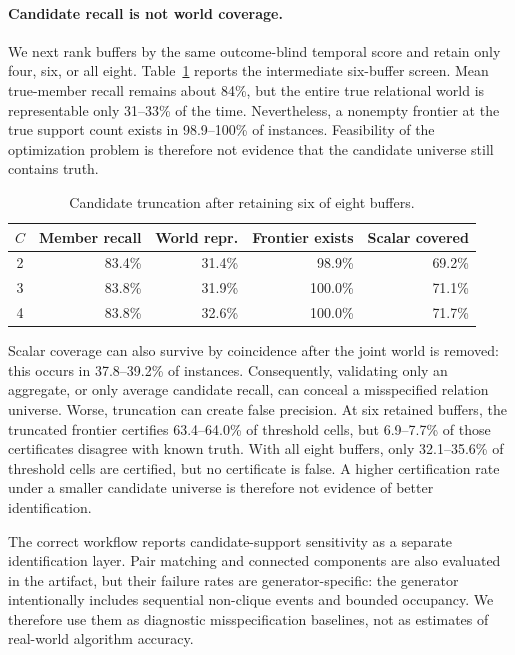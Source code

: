\paragraph{Candidate recall is not world coverage.}
We next rank buffers by the same outcome-blind temporal score and retain only
four, six, or all eight. Table~\ref{tab:truncation} reports the intermediate
six-buffer screen. Mean true-member recall remains about 84\%, but the entire
true relational world is representable only 31--33\% of the time. Nevertheless,
a nonempty frontier at the true support count exists in 98.9--100\% of
instances. Feasibility of the optimization problem is therefore not evidence
that the candidate universe still contains truth.

\begin{table}[t]
\caption{Candidate truncation after retaining six of eight buffers.}
\label{tab:truncation}
\small
\centering
\begin{tabular}{@{}crrrr@{}}
\toprule
$C$ & Member recall & World repr. & Frontier exists & Scalar covered \\
\midrule
2 & 83.4\% & 31.4\% & 98.9\% & 69.2\% \\
3 & 83.8\% & 31.9\% & 100.0\% & 71.1\% \\
4 & 83.8\% & 32.6\% & 100.0\% & 71.7\% \\
\bottomrule
\end{tabular}
\end{table}

Scalar coverage can also survive by coincidence after the joint world is
removed: this occurs in 37.8--39.2\% of instances. Consequently, validating
only an aggregate, or only average candidate recall, can conceal a misspecified
relation universe. Worse, truncation can create false precision. At six retained
buffers, the truncated frontier certifies 63.4--64.0\% of threshold cells, but
6.9--7.7\% of those certificates disagree with known truth. With all eight
buffers, only 32.1--35.6\% of threshold cells are certified, but no certificate
is false. A higher certification rate under a smaller candidate universe is
therefore not evidence of better identification.

The correct workflow reports candidate-support sensitivity as a separate
identification layer. Pair matching and connected components are
also evaluated in the artifact, but their failure rates are generator-specific:
the generator intentionally includes sequential non-clique events and bounded
occupancy. We therefore use them as diagnostic misspecification baselines, not
as estimates of real-world algorithm accuracy.
